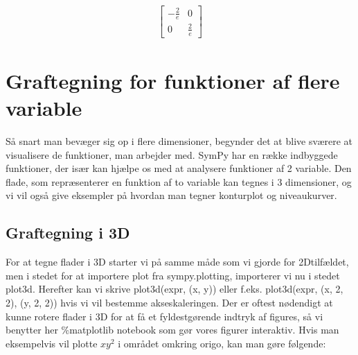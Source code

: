 \documentclass[letterpaper,10pt,english]{jupyterBook}
\begin{document}
\begin{sphinxVerbatim}[commandchars=\\\{\}]
  
\end{sphinxVerbatim}
\begin{equation*}
\begin{split}\displaystyle \left[\begin{matrix}- \frac{2}{e} & 0\\0 & \frac{2}{e}\end{matrix}\right]\end{split}
\end{equation*}

\section{Graftegning for funktioner af flere variable}
\label{\detokenize{notebooks/sympy/Notebook_FlereVar_plot:graftegning-for-funktioner-af-flere-variable}}\label{\detokenize{notebooks/sympy/Notebook_FlereVar_plot::doc}}
Så snart man bevæger sig op i flere dimensioner, begynder det at blive sværere at visualisere de funktioner, man arbejder med. SymPy har en række indbyggede funktioner, der især kan hjælpe os med at analysere funktioner af 2 variable. Den flade, som repræsenterer en funktion af to variable kan tegnes i 3 dimensioner, og vi vil også give eksempler på hvordan man tegner konturplot og niveaukurver.


\begin{sphinxVerbatim}[commandchars=\\\{\}]
    
    
\end{sphinxVerbatim}


\subsection{Graftegning i 3D}
\label{\detokenize{notebooks/sympy/Notebook_FlereVar_plot:graftegning-i-3d}}
For at tegne flader i 3D starter vi på samme måde som vi gjorde for 2D\sphinxhyphen{}tilfældet, men i stedet for at importere plot fra sympy.plotting, importerer vi nu i stedet plot3d. Herefter kan vi skrive plot3d(expr, (x, y)) eller f.eks. plot3d(expr, (x, \sphinxhyphen{}2, 2), (y, \sphinxhyphen{}2, 2)) hvis vi vil bestemme akseskaleringen. Der er oftest nødendigt at kunne rotere flader i 3D for at få et fyldestgørende indtryk af figures, så vi benytter her \%matplotlib notebook som gør vores figurer interaktiv. Hvis man eksempelvis vil plotte \(xy^2\) i området omkring origo, kan man gøre følgende:
\end{document}
